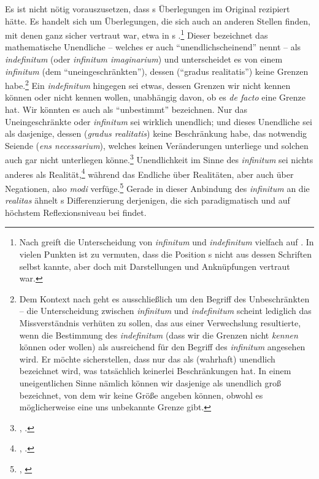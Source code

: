 Es ist nicht nötig vorauszusetzen, dass 
s Überlegungen im Original
rezipiert hätte. Es handelt sich um Überlegungen, die sich auch an anderen
Stellen finden, mit denen  ganz sicher vertraut war, etwa
in s
.\footnote{Nach 
greift  die Unterscheidung von \emph{infinitum} und
\emph{indefinitum} vielfach auf
\parencite[vgl.][\pno~354\,f.]{Engelhard:DasEinfacheunddieMaterie2005}. In
vielen Punkten ist zu vermuten, dass  die Position
s nicht aus dessen Schriften selbst kannte,
aber doch mit Darstellungen und Anknüpfungen vertraut war.} Dieser bezeichnet
das mathematische Unendliche -- welches er auch \enquote{unendlichscheinend}
nennt -- als \emph{indefinitum} (oder \emph{infinitum imaginarium}) und
unterscheidet es von einem \emph{infinitum} (dem \enquote{uneingeschränkten}),
dessen  (\enquote{gradus realitatis}) keine Grenzen
habe.\footnote{Dem Kontext nach geht es 
ausschließlich um den Begriff des Unbeschränkten -- die Unterscheidung zwischen
\emph{infinitum} und \emph{indefinitum} scheint lediglich das Missverständnis
verhüten zu sollen, das aus einer Verwechslung resultierte, wenn die Bestimmung
des \emph{indefinitum} (dass wir die Grenzen nicht \emph{kennen} können oder
wollen) als ausreichend für den Begriff des \emph{infinitum} angesehen wird. Er
möchte sicherstellen, dass nur das als (wahrhaft) unendlich bezeichnet wird, was
tatsächlich keinerlei Beschränkungen hat. In einem uneigentlichen Sinne nämlich
können wir dasjenige als unendlich groß bezeichnet, von dem wir keine Größe
angeben können, obwohl es möglicherweise eine uns unbekannte Grenze
gibt.} Ein \emph{indefinitum} hingegen sei etwas, dessen Grenzen wir
nicht kennen können oder nicht kennen
wollen, unabhängig davon, ob es \emph{de facto} eine Grenze hat. Wir könnten es
auch als \enquote{unbestimmt} bezeichnen. Nur das Uneingeschränkte oder
\emph{infinitum} sei wirklich unendlich; und dieses Unendliche sei als
dasjenige, dessen  (\emph{gradus realitatis}) keine
Beschränkung habe, das notwendig Seiende (\emph{ens
necessarium}), welches keinen Veränderungen unterliege und solchen auch gar
nicht unterliegen
könne.\footnote{\cite[Vgl.][\S\S~253--258]{Baumgarten:Metaphysica---Metaphysik2011},
\cite[][XVII: 82.2--21]{Kant:GesammelteWerke1900ff.}.} Unendlichkeit im Sinne
des \emph{infinitum} sei nichts anderes als Realität,\footnote{\cite[Vgl.][\S~261]{Baumgarten:Metaphysica---Metaphysik2011}, \cite[][XVII: 82.34--35]{Kant:GesammelteWerke1900ff.}.} während das Endliche über Realitäten, aber auch über Negationen, also \emph{modi}
verfüge.\footnote{\cite[Vgl.][\S~263]{Baumgarten:Metaphysica---Metaphysik2011},
\cite[][XVII: 83.5--8]{Kant:GesammelteWerke1900ff.}} Gerade in dieser Anbindung
des \emph{infinitum} an die \emph{realitas} ähnelt
s Differenzierung
derjenigen, die sich paradigmatisch und auf höchstem Reflexionsniveau bei 
findet.


